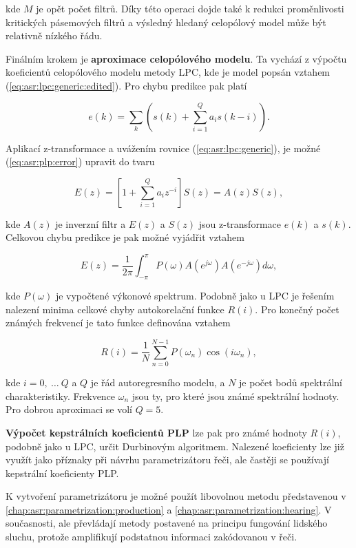 \noindent kde $M$ je opět počet filtrů. Díky této operaci dojde také k redukci proměnlivosti  kritických pásemových filtrů a výsledný hledaný celopólový model může být relativně nízkého řádu.

Finálním krokem je \textbf{aproximace celopólového modelu}. Ta vychází z výpočtu koeficientů celopólového modelu metody LPC, kde je model popsán vztahem (\ref{eq:asr:lpc:generic:edited}). Pro chybu predikce pak platí

\begin{equation}
  e\left(k\right) = \sum_{k} \left(s\left(k\right) + \sum_{i=1}^{Q} a_i s\left(k - i\right)\right).
  \label{eq:asr:plp:error}
\end{equation}

\noindent Aplikací z-transformace a uvážením rovnice (\ref{eq:asr:lpc:generic}), je možné (\ref{eq:asr:plp:error}) upravit do tvaru

\begin{equation}
  E\left(z\right) = \left[1 + \sum_{i=1}^{Q} a_i z^{-i}\right] S\left(z\right) = A\left(z\right)S\left(z\right),
  \label{eq:asr:plp:error:transform}
\end{equation}

\noindent kde $A\left(z\right)$ je inverzní filtr a $E\left(z\right)$ a $S\left(z\right)$ jsou z-transformace $e\left(k\right)$ a $s\left(k\right)$. Celkovou chybu predikce je pak možné vyjádřit vztahem

\begin{equation}
  E\left(z\right) = \frac{1}{2\pi} \int_{-\pi}^{\pi} P\left(\omega\right) A\left(e^{j\omega}\right) A\left(e^{-j\omega}\right)d\omega,
  \label{eq:asr:plp:error:final}
\end{equation}

\noindent kde $P\left(\omega\right)$ je vypočtené výkonové spektrum. Podobně jako u LPC je řešením nalezení minima celkové chyby autokorelační funkce $R\left(i\right)$. Pro konečný počet známých frekvencí je tato funkce definována vztahem

\begin{equation}
  R\left(i\right) = \frac{1}{N} \sum_{n=0}^{N-1} P\left(\omega_n\right) \cos\left(i\omega_n\right),
  \label{eq:asr:plp:error:solution}
\end{equation}

\noindent kde $i = 0,\ \dots\ Q$ a $Q$ je řád autoregresního modelu, a $N$ je počet bodů spektrální charakteristiky. Frekvence $\omega_n$ jsou ty, pro které jsou známé spektrální hodnoty. Pro dobrou aproximaci se volí $Q = 5$.

\textbf{Výpočet kepstrálních koeficientů PLP} lze pak pro známé hodnoty $R\left(i\right)$, podobně jako u LPC, určit  Durbinovým algoritmem. Nalezené koeficienty lze již využít jako příznaky při návrhu parametrizátoru řeči, ale častěji se používají kepstrální koeficienty PLP. \cite{Holmes2001}

K vytvoření parametrizátoru je možné použít libovolnou metodu představenou v \ref{chap:asr:parametrization:production} a \ref{chap:asr:parametrization:hearing}. V současnosti, ale převládají metody postavené na principu fungování lidského sluchu, protože amplifikují podstatnou informaci zakódovanou v řeči.
